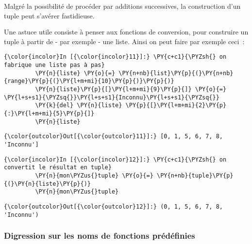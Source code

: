     Malgré la possibilité de procéder par additions successives, la
construction d'un tuple peut s'avérer fastidieuse.

    Une astuce utile consiste à penser aux fonctions de conversion, pour
construire un tuple à partir de - par exemple - une liste. Ainsi on peut
faire par exemple ceci~:

    \begin{Verbatim}[commandchars=\\\{\},frame=single,framerule=0.3mm,rulecolor=\color{cellframecolor}]
{\color{incolor}In [{\color{incolor}11}]:} \PY{c+c1}{\PYZsh{} on fabrique une liste pas à pas}
         \PY{n}{liste} \PY{o}{=} \PY{n+nb}{list}\PY{p}{(}\PY{n+nb}{range}\PY{p}{(}\PY{l+m+mi}{10}\PY{p}{)}\PY{p}{)}
         \PY{n}{liste}\PY{p}{[}\PY{l+m+mi}{9}\PY{p}{]} \PY{o}{=} \PY{l+s+s1}{\PYZsq{}}\PY{l+s+s1}{Inconnu}\PY{l+s+s1}{\PYZsq{}}
         \PY{k}{del} \PY{n}{liste} \PY{p}{[}\PY{l+m+mi}{2}\PY{p}{:}\PY{l+m+mi}{5}\PY{p}{]}
         \PY{n}{liste}
\end{Verbatim}


\begin{Verbatim}[commandchars=\\\{\},frame=single,framerule=0.3mm,rulecolor=\color{cellframecolor}]
{\color{outcolor}Out[{\color{outcolor}11}]:} [0, 1, 5, 6, 7, 8, 'Inconnu']
\end{Verbatim}
            
    \begin{Verbatim}[commandchars=\\\{\},frame=single,framerule=0.3mm,rulecolor=\color{cellframecolor}]
{\color{incolor}In [{\color{incolor}12}]:} \PY{c+c1}{\PYZsh{} on convertit le résultat en tuple}
         \PY{n}{mon\PYZus{}tuple} \PY{o}{=} \PY{n+nb}{tuple}\PY{p}{(}\PY{n}{liste}\PY{p}{)}
         \PY{n}{mon\PYZus{}tuple}
\end{Verbatim}


\begin{Verbatim}[commandchars=\\\{\},frame=single,framerule=0.3mm,rulecolor=\color{cellframecolor}]
{\color{outcolor}Out[{\color{outcolor}12}]:} (0, 1, 5, 6, 7, 8, 'Inconnu')
\end{Verbatim}
            
    \hypertarget{digression-sur-les-noms-de-fonctions-pruxe9duxe9finies}{%
\subsubsection{Digression sur les noms de fonctions
prédéfinies}\label{digression-sur-les-noms-de-fonctions-pruxe9duxe9finies}}

